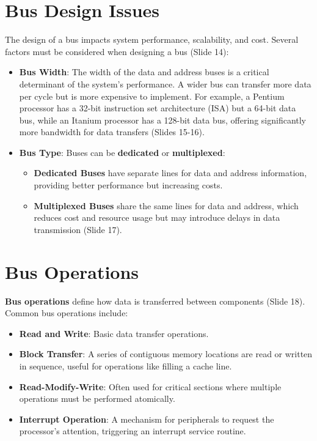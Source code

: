\documentclass[
  14pt,
  a4paper,
  numbers=noendperiod,
  headinclude=true,
  footinclude=true,
  DIV=calc]{scrreprt}
\begin{document}
\section{Bus Design Issues}\label{bus-design-issues}

The design of a bus impacts system performance, scalability, and cost.
Several factors must be considered when designing a bus (Slide 14):

\begin{itemize}
\item
  \textbf{Bus Width}: The width of the data and address buses is a
  critical determinant of the system's performance. A wider bus can
  transfer more data per cycle but is more expensive to implement. For
  example, a Pentium processor has a 32-bit instruction set architecture
  (ISA) but a 64-bit data bus, while an Itanium processor has a 128-bit
  data bus, offering significantly more bandwidth for data transfers
  (Slides 15-16).
\item
  \textbf{Bus Type}: Buses can be \textbf{dedicated} or
  \textbf{multiplexed}:

  \begin{itemize}
  \item
    \textbf{Dedicated Buses} have separate lines for data and address
    information, providing better performance but increasing costs.
  \item
    \textbf{Multiplexed Buses} share the same lines for data and
    address, which reduces cost and resource usage but may introduce
    delays in data transmission (Slide 17).
  \end{itemize}
\end{itemize}

\section{Bus Operations}\label{bus-operations}

\textbf{Bus operations} define how data is transferred between
components (Slide 18). Common bus operations include:

\begin{itemize}
\item
  \textbf{Read and Write}: Basic data transfer operations.
\item
  \textbf{Block Transfer}: A series of contiguous memory locations are
  read or written in sequence, useful for operations like filling a
  cache line.
\item
  \textbf{Read-Modify-Write}: Often used for critical sections where
  multiple operations must be performed atomically.
\item
  \textbf{Interrupt Operation}: A mechanism for peripherals to request
  the processor's attention, triggering an interrupt service routine.
\end{itemize}
\end{document}

